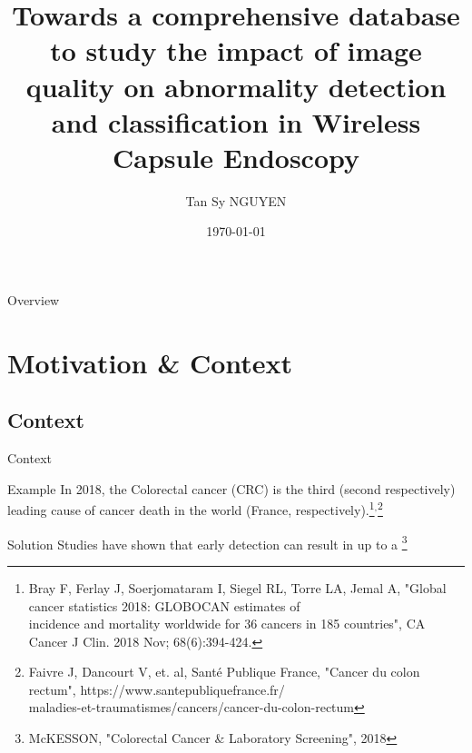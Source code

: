 \documentclass{libs/ufc_format}
\title[Universit\'e Sorbonne Paris Nord]{\textbf{Towards a comprehensive database to study the impact of image quality on abnormality detection and classification in Wireless Capsule Endoscopy}}
\author{Tan Sy NGUYEN}
\institute[]{
    \normalsize{\email{tansy.nguyen@math.univ-paris13.fr}}
    \newline
    \department{LAGA, L2TI}
    \newline
    \uspn
}
\date{\today}
\begin{document}


\begin{frame}{}
    \maketitle
\end{frame}

\begin{frame}{Overview}
    \tableofcontents
\end{frame}

\section{Motivation \& Context}
\subsection{Context}

\begin{frame}{Context}
    \begin{block}{Example}
        In 2018, the Colorectal cancer (CRC) is the third (second respectively) leading cause of cancer death in the world (France, respectively).\footnote[frame]{\tiny Bray F, Ferlay J, Soerjomataram I, Siegel RL, Torre LA, Jemal A, "Global cancer statistics 2018: GLOBOCAN estimates of \\ \hspace{0.3cm}incidence and mortality worldwide for 36 cancers in 185 countries", CA Cancer J Clin. 2018 Nov; 68(6):394-424.}$^{,}$\footnote[frame]{\tiny Faivre J, Dancourt V, et. al, Santé Publique France, "Cancer du colon rectum", https://www.santepubliquefrance.fr/\\maladies-et-traumatismes/cancers/cancer-du-colon-rectum}
    \end{block}
    \pause
    \begin{exampleblock}{Solution}
        Studies have shown that early detection can result in up to a \footnote[frame]{\tiny McKESSON, "Colorectal Cancer \& Laboratory Screening", 2018}
    \end{exampleblock}

\end{frame}
\end{document}
